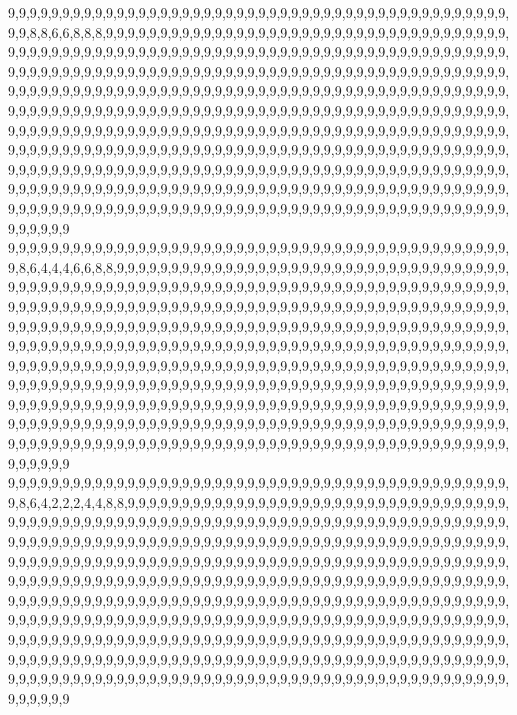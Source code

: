 9,9,9,9,9,9,9,9,9,9,9,9,9,9,9,9,9,9,9,9,9,9,9,9,9,9,9,9,9,9,9,9,9,9,9,9,9,9,9,9,9,9,9,9,9,9,9,9,8,8,6,6,8,8,8,9,9,9,9,9,9,9,9,9,9,9,9,9,9,9,9,9,9,9,9,9,9,9,9,9,9,9,9,9,9,9,9,9,9,9,9,9,9,9,9,9,9,9,9,9,9,9,9,9,9,9,9,9,9,9,9,9,9,9,9,9,9,9,9,9,9,9,9,9,9,9,9,9,9,9,9,9,9,9,9,9,9,9,9,9,9,9,9,9,9,9,9,9,9,9,9,9,9,9,9,9,9,9,9,9,9,9,9,9,9,9,9,9,9,9,9,9,9,9,9,9,9,9,9,9,9,9,9,9,9,9,9,9,9,9,9,9,9,9,9,9,9,9,9,9,9,9,9,9,9,9,9,9,9,9,9,9,9,9,9,9,9,9,9,9,9,9,9,9,9,9,9,9,9,9,9,9,9,9,9,9,9,9,9,9,9,9,9,9,9,9,9,9,9,9,9,9,9,9,9,9,9,9,9,9,9,9,9,9,9,9,9,9,9,9,9,9,9,9,9,9,9,9,9,9,9,9,9,9,9,9,9,9,9,9,9,9,9,9,9,9,9,9,9,9,9,9,9,9,9,9,9,9,9,9,9,9,9,9,9,9,9,9,9,9,9,9,9,9,9,9,9,9,9,9,9,9,9,9,9,9,9,9,9,9,9,9,9,9,9,9,9,9,9,9,9,9,9,9,9,9,9,9,9,9,9,9,9,9,9,9,9,9,9,9,9,9,9,9,9,9,9,9,9,9,9,9,9,9,9,9,9,9,9,9,9,9,9,9,9,9,9,9,9,9,9,9,9,9,9,9,9,9,9,9,9,9,9,9,9,9,9,9,9,9,9,9,9,9,9,9,9,9,9,9,9,9,9,9,9,9,9,9,9,9,9,9,9,9,9,9,9,9,9,9,9,9,9,9,9,9,9,9,9,9,9,9,9,9,9,9,9,9,9,9,9,9,9,9,9,9,9,9,9,9,9,9,9,9,9,9,9,9,9,9,9,9,9,9,9,9,9,9,9,9,9,9,9,9,9,9,9,9,9,9,9,9
9,9,9,9,9,9,9,9,9,9,9,9,9,9,9,9,9,9,9,9,9,9,9,9,9,9,9,9,9,9,9,9,9,9,9,9,9,9,9,9,9,9,9,9,9,9,9,8,6,4,4,4,6,6,8,8,9,9,9,9,9,9,9,9,9,9,9,9,9,9,9,9,9,9,9,9,9,9,9,9,9,9,9,9,9,9,9,9,9,9,9,9,9,9,9,9,9,9,9,9,9,9,9,9,9,9,9,9,9,9,9,9,9,9,9,9,9,9,9,9,9,9,9,9,9,9,9,9,9,9,9,9,9,9,9,9,9,9,9,9,9,9,9,9,9,9,9,9,9,9,9,9,9,9,9,9,9,9,9,9,9,9,9,9,9,9,9,9,9,9,9,9,9,9,9,9,9,9,9,9,9,9,9,9,9,9,9,9,9,9,9,9,9,9,9,9,9,9,9,9,9,9,9,9,9,9,9,9,9,9,9,9,9,9,9,9,9,9,9,9,9,9,9,9,9,9,9,9,9,9,9,9,9,9,9,9,9,9,9,9,9,9,9,9,9,9,9,9,9,9,9,9,9,9,9,9,9,9,9,9,9,9,9,9,9,9,9,9,9,9,9,9,9,9,9,9,9,9,9,9,9,9,9,9,9,9,9,9,9,9,9,9,9,9,9,9,9,9,9,9,9,9,9,9,9,9,9,9,9,9,9,9,9,9,9,9,9,9,9,9,9,9,9,9,9,9,9,9,9,9,9,9,9,9,9,9,9,9,9,9,9,9,9,9,9,9,9,9,9,9,9,9,9,9,9,9,9,9,9,9,9,9,9,9,9,9,9,9,9,9,9,9,9,9,9,9,9,9,9,9,9,9,9,9,9,9,9,9,9,9,9,9,9,9,9,9,9,9,9,9,9,9,9,9,9,9,9,9,9,9,9,9,9,9,9,9,9,9,9,9,9,9,9,9,9,9,9,9,9,9,9,9,9,9,9,9,9,9,9,9,9,9,9,9,9,9,9,9,9,9,9,9,9,9,9,9,9,9,9,9,9,9,9,9,9,9,9,9,9,9,9,9,9,9,9,9,9,9,9,9,9,9,9,9,9,9,9,9,9,9,9,9,9,9,9,9,9,9,9,9,9,9,9,9,9,9,9,9,9,9,9,9
9,9,9,9,9,9,9,9,9,9,9,9,9,9,9,9,9,9,9,9,9,9,9,9,9,9,9,9,9,9,9,9,9,9,9,9,9,9,9,9,9,9,9,9,9,9,9,8,6,4,2,2,2,4,4,8,8,9,9,9,9,9,9,9,9,9,9,9,9,9,9,9,9,9,9,9,9,9,9,9,9,9,9,9,9,9,9,9,9,9,9,9,9,9,9,9,9,9,9,9,9,9,9,9,9,9,9,9,9,9,9,9,9,9,9,9,9,9,9,9,9,9,9,9,9,9,9,9,9,9,9,9,9,9,9,9,9,9,9,9,9,9,9,9,9,9,9,9,9,9,9,9,9,9,9,9,9,9,9,9,9,9,9,9,9,9,9,9,9,9,9,9,9,9,9,9,9,9,9,9,9,9,9,9,9,9,9,9,9,9,9,9,9,9,9,9,9,9,9,9,9,9,9,9,9,9,9,9,9,9,9,9,9,9,9,9,9,9,9,9,9,9,9,9,9,9,9,9,9,9,9,9,9,9,9,9,9,9,9,9,9,9,9,9,9,9,9,9,9,9,9,9,9,9,9,9,9,9,9,9,9,9,9,9,9,9,9,9,9,9,9,9,9,9,9,9,9,9,9,9,9,9,9,9,9,9,9,9,9,9,9,9,9,9,9,9,9,9,9,9,9,9,9,9,9,9,9,9,9,9,9,9,9,9,9,9,9,9,9,9,9,9,9,9,9,9,9,9,9,9,9,9,9,9,9,9,9,9,9,9,9,9,9,9,9,9,9,9,9,9,9,9,9,9,9,9,9,9,9,9,9,9,9,9,9,9,9,9,9,9,9,9,9,9,9,9,9,9,9,9,9,9,9,9,9,9,9,9,9,9,9,9,9,9,9,9,9,9,9,9,9,9,9,9,9,9,9,9,9,9,9,9,9,9,9,9,9,9,9,9,9,9,9,9,9,9,9,9,9,9,9,9,9,9,9,9,9,9,9,9,9,9,9,9,9,9,9,9,9,9,9,9,9,9,9,9,9,9,9,9,9,9,9,9,9,9,9,9,9,9,9,9,9,9,9,9,9,9,9,9,9,9,9,9,9,9,9,9,9,9,9,9,9,9,9,9,9,9,9,9,9,9,9,9,9,9,9,9,9,9,9,9
